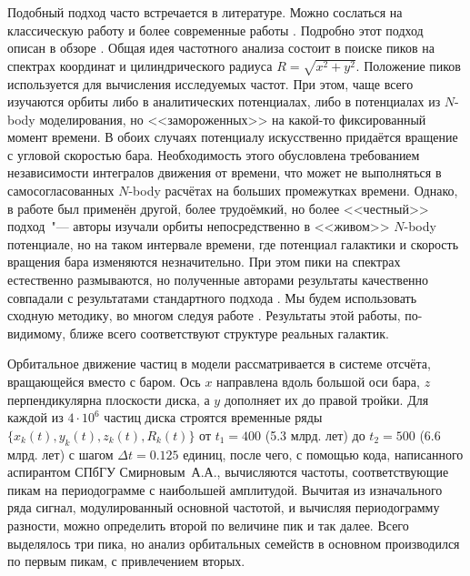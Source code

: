 \documentclass{trlnotes}
\begin{document}
Подобный подход часто встречается в литературе. Можно сослаться на классическую работу \citet{binney1982} и более
современные работы  \citep{athanassoula2002,portail2015,valluri2016}. Подробно этот подход описан в обзоре
\citet{athanassoula2013}. Общая идея частотного анализа состоит в поиске пиков на спектрах координат и цилиндрического
радиуса $R = \sqrt{x^2 + y^2}$. Положение пиков используется для  вычисления исследуемых частот.  При этом, чаще всего
изучаются орбиты либо в аналитических потенциалах, либо в потенциалах из $N$-body моделирования, но <<замороженных>> на
какой-то фиксированный момент времени. В обоих случаях потенциалу искусственно придаётся вращение с угловой скоростью
бара. Необходимость этого обусловлена требованием независимости интегралов движения от времени, что может не
выполняться в самосогласованных $N$-body расчётах на больших промежутках времени.  Однако, в
работе \citet{ceverino2007}
был применён другой, более трудоёмкий, но более <<честный>> подход~"--- авторы изучали орбиты непосредственно в
<<живом>> $N$-body потенциале, но на таком интервале времени, где потенциал галактики и скорость вращения бара
изменяются незначительно. При этом пики на спектрах естественно размываются, но полученные авторами результаты качественно совпадали с результатами стандартного подхода \citep{athanassoula2002a}.  Мы будем использовать сходную методику, во многом следуя работе \citet{gajda2016}. Результаты этой работы, по-видимому, ближе всего соответствуют структуре реальных галактик.

Орбитальное движение частиц в модели рассматривается в системе отсчёта, вращающейся вместо с баром. Ось $x$ направлена
вдоль большой оси бара, $z$ перпендикулярна плоскости диска, а $y$ дополняет их до правой тройки.  Для каждой из $4\cdot
10^6$ частиц диска строятся временные ряды $\{x_k(t), y_k(t), z_k(t), R_k(t)\}$ от $t_1=400$ (5.3 млрд. лет) до
$t_2=500$ (6.6 млрд. лет) с шагом $Δt = 0.125$ единиц, после чего, с помощью кода, написанного аспирантом СПбГУ
Смирновым~А.А., вычисляются частоты, соответствующие пикам на периодограмме с наибольшей амплитудой. Вычитая из
изначального ряда сигнал, модулированный основной частотой, и вычисляя периодограмму разности, можно определить второй по
величине пик и так далее. Всего выделялось три пика, но анализ орбитальных семейств в основном производился по первым
пикам, с привлечением вторых.
\end{document}
